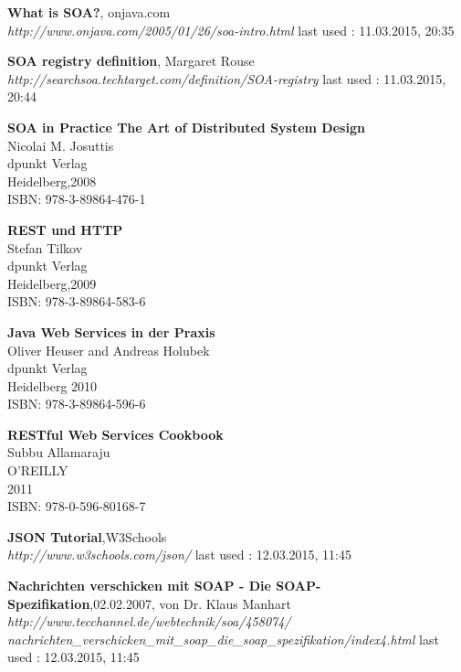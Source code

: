 \documentclass[12pt]{article}
\begin{document}
\begin{thebibliography}{56}
   	  
     	     	     	 
   \textbf{What is SOA?}, onjava.com \\
  \textit{http://www.onjava.com/2005/01/26/soa-intro.html}
  \newline last used : 11.03.2015, 20:35
 	 
 	 
   \textbf{SOA registry definition}, Margaret Rouse\\
  \textit{http://searchsoa.techtarget.com/definition/SOA-registry}
  \newline last used : 11.03.2015, 20:44 	 
   	     	   
   \textbf{SOA in Practice The Art of Distributed System Design}\\
   Nicolai M. Josuttis\\
   dpunkt Verlag \\
   Heidelberg,2008 \\
	ISBN: 978-3-89864-476-1

  \textbf{REST und HTTP}\\
   Stefan Tilkov\\
   dpunkt Verlag \\
   Heidelberg,2009 \\
	ISBN: 978-3-89864-583-6

  \textbf{Java Web Services in der Praxis}\\
  Oliver Heuser and Andreas Holubek\\
  dpunkt Verlag \\
  Heidelberg 2010 \\
	ISBN: 978-3-89864-596-6

  \textbf{RESTful Web Services Cookbook}\\
   Subbu Allamaraju\\
   O'REILLY \\
   2011 \\
	ISBN: 978-0-596-80168-7

  \textbf{JSON Tutorial},W3Schools\\
  \textit{http://www.w3schools.com/json/}
  \newline last used : 12.03.2015, 11:45
  
  \textbf{Nachrichten verschicken mit SOAP - Die SOAP-Spezifikation},02.02.2007, von Dr. Klaus Manhart\\
  \textit{http://www.tecchannel.de/webtechnik/soa/458074/\\nachrichten\_verschicken\_mit\_soap\_die\_soap\_spezifikation/index4.html
}
  \newline last used : 12.03.2015, 11:45



 	 
 	 
\end{thebibliography}
\end{document}
